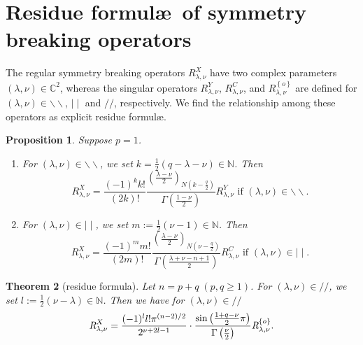 \documentclass[reqno,12pt]{pja00} %
\providecommand{\C}{\mathbb{C}}
\newcommand{\N}{\mathbb{N}}
\theoremstyle{plain}
\newtheorem{theorem}{Theorem}[section]
\newtheorem{proposition}[theorem]{Proposition}
\theoremstyle{definition}
\theoremstyle{exampstyle} \newtheorem{examp}[theorem]{Theorem}
\newcommand{\OpR}{\mbox{\it R}}
\begin{document}
\section{Residue formul\ae\, of symmetry breaking operators}
The regular symmetry breaking operators $R_{\lambda,\nu}^X$ have two complex parameters $(\lambda,\nu)\in\C^2$, whereas the singular operators $R_{\lambda,\nu}^Y$, $R_{\lambda,\nu}^C$, and
$R_{\lambda,\nu}^{ \left\{ o \right\}}$ are defined
for $(\lambda,\nu)\in\backslash\backslash$, $\mid\mid$ and $//$, respectively. We find the relationship
among these operators as explicit residue formul\ae. 

\begin{proposition}\label{prop}
	Suppose $p=1$.\begin{enumerate}[(1)]
		\item For $(\lambda,\nu)\in\backslash\backslash$, we set $k=\frac{1}{2}\left( q-\lambda-\nu \right)\in\N$. Then
\begin{equation*}
R_{\lambda,\nu}^X=\frac{(-1)^kk!}{(2k)!}\frac{\left( \frac{\lambda-\nu}{2} \right)_{N\left(k-\frac{q}{2}  \right)}}{\Gamma\left( \frac{1-\nu}{2}\right) }R_{\lambda,\nu}^Y\mbox{ if }(\lambda,\nu)\in\backslash\backslash.
\end{equation*}
\item For $(\lambda,\nu)\in\mid\mid$, we set $m:=\frac{1}{2}\left( \nu-1 \right)\in\N$. Then
\begin{equation*}
R_{\lambda,\nu}^X=\frac{(-1)^mm!}{(2m)!}\frac{\left( \frac{\lambda-\nu}{2} \right)_{N\left( \nu-\frac{q}{2} \right)}}{\Gamma\left( \frac{\lambda+\nu-n+1}{2}\right)}R_{\lambda,\nu}^C\mbox{ if }(\lambda,\nu)\in\mid\mid.
\end{equation*}
	\end{enumerate}
\end{proposition}
\begin{theorem}[residue formula]
\label{thm:residue}
	Let $n=p+q\;(p,q\ge1)$.
	For $(\lambda,\nu)\in//$, we set $l:=\frac{1}{2}\left( \nu-\lambda \right)\in\N$. Then we have for $(\lambda,\nu)\in//$
  \[\OpR_{\lambda,\nu}^X  = \frac{ (- 1)^l l!\pi^{(n - 2) / 2} 
		}{2^{ \nu + 2 l-1}}\cdot  \frac{\sin\left( \frac{1+q-\nu}{2}\pi \right)}{\Gamma\left( \frac{\nu}{2} \right)}
	\OpR_{\lambda,\nu}^{ \left\{ o \right\} }. \]
	\end{theorem}
\end{document}
